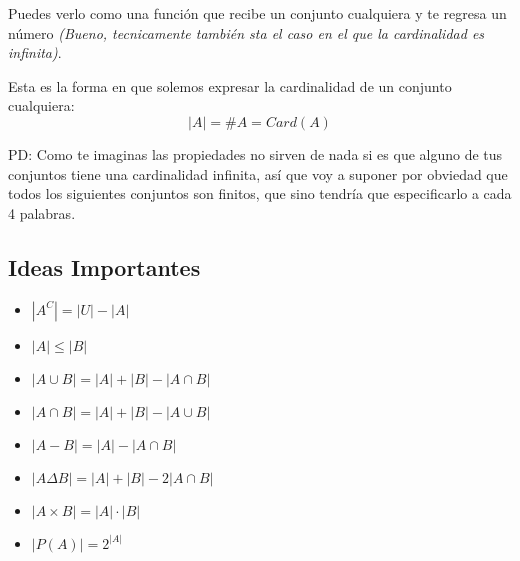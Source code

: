 \documentclass[12pt, fleqn]{report}                             %
\begin{document}
            Puedes verlo como una función que recibe un conjunto cualquiera y te regresa
            un número \emph{(Bueno, tecnicamente también sta el caso en el que la cardinalidad es infinita)}.

            Esta es la forma en que solemos expresar la cardinalidad de un conjunto cualquiera:
            \begin{equation}   
                |A| = \#A = Card(A)
            \end{equation}

            PD: Como te imaginas las propiedades no sirven de nada si es que alguno de tus conjuntos
            tiene una cardinalidad infinita, así que voy a suponer por obviedad que todos los siguientes
            conjuntos son finitos, que sino tendría que especificarlo a cada 4 palabras.



            \clearpage
            \subsection{Ideas Importantes}

                \begin{itemize}
                    \item $|A^C| = |U| - |A|$
                    \item $|A| \leq |B|$
                    \item $|A \cup B| = |A| + |B| - |A \cap B|$
                    \item $|A \cap B| = |A| + |B| - |A \cup B|$
                    \item $|A - B| = |A| - |A \cap B|$
                    \item $|A \Delta B| = |A| + |B| - 2|A \cap B|$
                    \item $|A \times B| = |A| \cdot |B|$
                    \item $|P(A)| = 2^{|A|}$
                \end{itemize}








\end{document}
